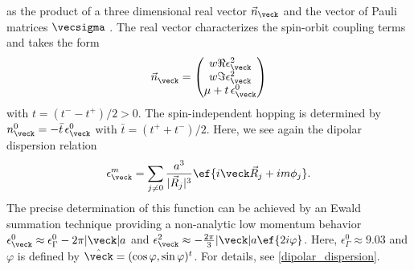 as the product of a three dimensional real vector $\vec{n}_{\veck}$ and the vector of Pauli matrices $\vecsigma$ \cite{Hasan2010,Bernevig2013}.
The real vector characterizes the spin-orbit coupling terms and takes the form
\begin{align}
    \vec{n}^{\vphantom 0}_{\veck} = \begin{pmatrix}
        w \Re \epsilon^2_{\veck} \\
        w \Im \epsilon^2_{\veck} \\
        \mu + t\, \epsilon^0_{\veck}
    \end{pmatrix}
\end{align}
with $t = (t^--t^+)/2 > 0$.
The spin-independent hopping is determined by $n^0_{\veck} = -\bar{t}\, \epsilon^0_{\veck}$ with ${\bar t} = (t^{+}+t^{-})/2$.
Here, we see again the dipolar dispersion relation~\cite{Muller2010,Peter2012b,Syzranov2014,Peter2014}
\begin{align}
    \epsilon^m_{\veck} = \sum_{j\ne 0} \frac{a^3}{|\vec{R}_j|^3}\ef{i\veck \vec{R}_j + i m \phi_{j}}.
\end{align}
The precise determination of this function can be achieved by an Ewald summation technique providing a non-analytic low momentum behavior
$\epsilon^0_{\veck} \approx \epsilon^0_{\Gamma} - 2\pi |\veck|a$ and
$\epsilon^2_{\veck} \approx -\frac{2\pi}{3} |\veck|a \ef{2i \varphi}$.
Here, $\epsilon^0_{\Gamma} \approx 9.03$ and $\varphi$ is defined by $\hat{\veck}=(\cos \varphi, \sin \varphi)^t$.
For details, see \cref{dipolar_dispersion}.


